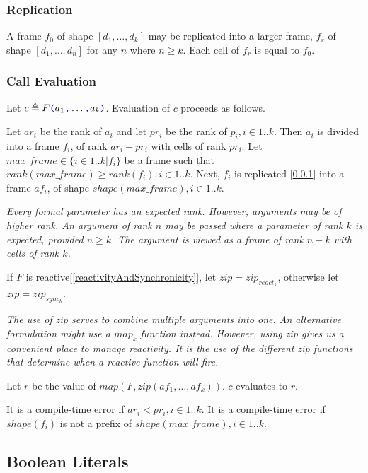 \documentclass{article}
\begin{document}
\subsubsection{Replication}
\label{replication}

A frame $f_0$ of shape $[d_1, \ldots, d_k]$ may be replicated into a larger frame, $f_r$ of shape $[d_1, \ldots, d_n]$ for any $n$ where $n \ge k$. Each cell of $f_r$ is equal to $f_0$.




\subsubsection{Call Evaluation}
\label{callEvaluation}


Let $c \triangleq F\texttt{\color{blue} (}{}a_1\texttt{\color{blue} ,}{} \ldots\texttt{\color{blue} ,}{} a_k\texttt{\color{blue} )}$. Evaluation of $c$ proceeds as follows. 

Let $ar_i$ be the rank of $a_i$ and let $pr_i$ be the rank of $p_i, i \in 1.. k$. Then  $a_i$ is divided into a frame $f_i$, of rank $ar_i - pr_i$ with cells of rank $pr_i$. Let $max\_frame \in \{i \in 1..k | f_i\}$ be a frame such that $rank(max\_frame) \ge rank(f_i), i \in 1 ..k$. Next, $f_i$ is replicated [\ref{replication}] into a frame $af_i$, of shape $shape(max\_frame), i \in 1..k$. 

{\em
Every formal parameter has an expected rank. However, arguments may be of higher rank. An argument of rank $n$ may be passed where a parameter of rank $k$ is expected, provided $n \ge k$. The argument is viewed as a frame of rank $n-k$ with cells of rank $k$. 
}

If $F$ is reactive[\ref{reactivityAndSynchronicity}], let $zip = zip_{react_k}$, otherwise let $zip = zip_{sync_k}$.

{\em
The use of zip serves to combine multiple arguments into one. An alternative formulation might use a $map_k$ function instead.
However, using zip gives us a convenient place to manage reactivity.
It is the use of the different zip functions that determine when a reactive function will fire. 
}

Let $r$ be the value of $map(F, zip(af_1, \ldots, af_k))$. $c$ evaluates to $r$.



It is a compile-time error if $ar_i < pr_i, i \in 1..k$. It is a compile-time error if $shape(f_i)$ is not a prefix of $shape(max\_frame), i \in 1..k$. 


\subsection{Boolean Literals}
\label{booleanLiterals}
\end{document}
